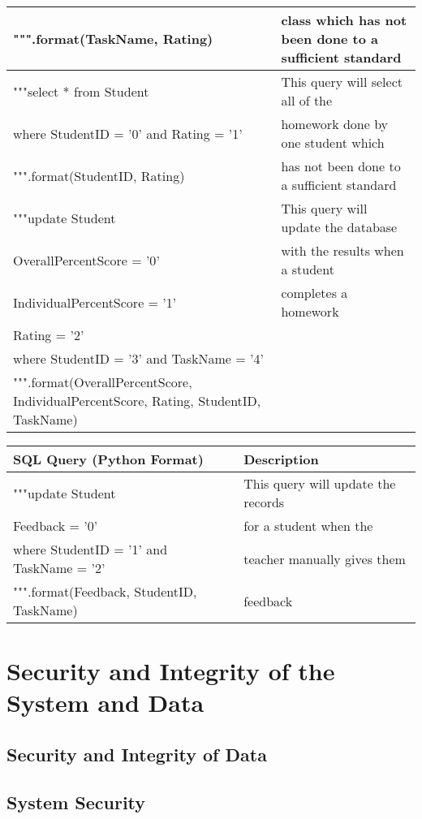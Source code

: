 \begin{center}
\begin{tabular}{|p{8cm}|p{6cm}|}
""".format(TaskName, Rating) & class which has not been done to a sufficient standard \\ \hline
"""select * from Student & This query will select all of the \\
where StudentID = '{0}' and Rating = '{1}' & homework done by one student which \\
""".format(StudentID, Rating) & has not been done to a sufficient standard \\ \hline
"""update Student & This query will update the database \\
OverallPercentScore = '{0}' & with the results when a student \\
IndividualPercentScore = '{1}' & completes a homework \\
Rating = '{2}' & \\
where StudentID = '{3}' and TaskName = '{4}' & \\
""".format(OverallPercentScore, IndividualPercentScore, Rating, StudentID, TaskName) & \\ \hline
\end{tabular}
\end{center}

\begin{center}
\begin{tabular}{|p{8cm}|p{6cm}|} \hline
\textbf{SQL Query (Python Format)} & \textbf{Description} \\ \hline
"""update Student & This query will update the records \\
Feedback = '{0}' & for a student when the \\
where StudentID = '{1}' and TaskName = '{2}' & teacher manually gives them \\
""".format(Feedback, StudentID, TaskName) & feedback \\ \hline
\end{tabular}
\end{center}

\section{Security and Integrity of the System and Data}

\subsection{Security and Integrity of Data}

\subsection{System Security}

